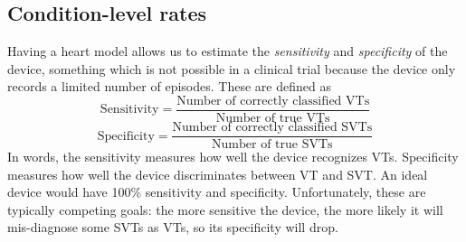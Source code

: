 %

\subsection{Condition-level rates}
\label{sec:condition-level}
Having a heart model allows us to estimate the \emph{sensitivity} and \emph{specificity} of the device, something which is not possible in a clinical trial because the device only records a limited number of episodes.
These are defined as
\[ \text{Sensitivity} = \frac{\text{Number of correctly classified VTs}}{\text{Number of true VTs}}\]
\[ \text{Specificity} = \frac{\text{Number of correctly classified SVTs}}{\text{Number of true SVTs}}\]
In words, the sensitivity measures how well the device recognizes VTs.
Specificity measures how well the device discriminates between VT and SVT.
An ideal device would have 100\% sensitivity and specificity.
Unfortunately, these are typically competing goals: the more sensitive the device, the more likely it will mis-diagnose some SVTs as VTs, so its specificity will drop.

